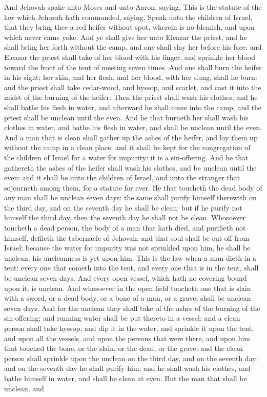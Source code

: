 And Jehovah spake unto Moses and unto Aaron, saying, This is the statute of the law which Jehovah hath commanded, saying, Speak unto the children of Israel, that they bring thee a red heifer without spot, wherein is no blemish, and upon which never came yoke. And ye shall give her unto Eleazar the priest, and he shall bring her forth without the camp, and one shall slay her before his face: and Eleazar the priest shall take of her blood with his finger, and sprinkle her blood toward the front of the tent of meeting seven times. And one shall burn the heifer in his sight; her skin, and her flesh, and her blood, with her dung, shall he burn: and the priest shall take cedar-wood, and hyssop, and scarlet, and cast it into the midst of the burning of the heifer. Then the priest shall wash his clothes, and he shall bathe his flesh in water, and afterward he shall come into the camp, and the priest shall be unclean until the even. And he that burneth her shall wash his clothes in water, and bathe his flesh in water, and shall be unclean until the even. And a man that is clean shall gather up the ashes of the heifer, and lay them up without the camp in a clean place; and it shall be kept for the congregation of the children of Israel for a water for impurity: it is a sin-offering. And he that gathereth the ashes of the heifer shall wash his clothes, and be unclean until the even: and it shall be unto the children of Israel, and unto the stranger that sojourneth among them, for a statute for ever.  He that toucheth the dead body of any man shall be unclean seven days: the same shall purify himself therewith on the third day, and on the seventh day he shall be clean: but if he purify not himself the third day, then the seventh day he shall not be clean. Whosoever toucheth a dead person, the body of a man that hath died, and purifieth not himself, defileth the tabernacle of Jehovah; and that soul shall be cut off from Israel: because the water for impurity was not sprinkled upon him, he shall be unclean; his uncleanness is yet upon him.  This is the law when a man dieth in a tent: every one that cometh into the tent, and every one that is in the tent, shall be unclean seven days. And every open vessel, which hath no covering bound upon it, is unclean. And whosoever in the open field toucheth one that is slain with a sword, or a dead body, or a bone of a man, or a grave, shall be unclean seven days. And for the unclean they shall take of the ashes of the burning of the sin-offering; and running water shall be put thereto in a vessel: and a clean person shall take hyssop, and dip it in the water, and sprinkle it upon the tent, and upon all the vessels, and upon the persons that were there, and upon him that touched the bone, or the slain, or the dead, or the grave: and the clean person shall sprinkle upon the unclean on the third day, and on the seventh day: and on the seventh day he shall purify him; and he shall wash his clothes, and bathe himself in water, and shall be clean at even.  But the man that shall be unclean, and 